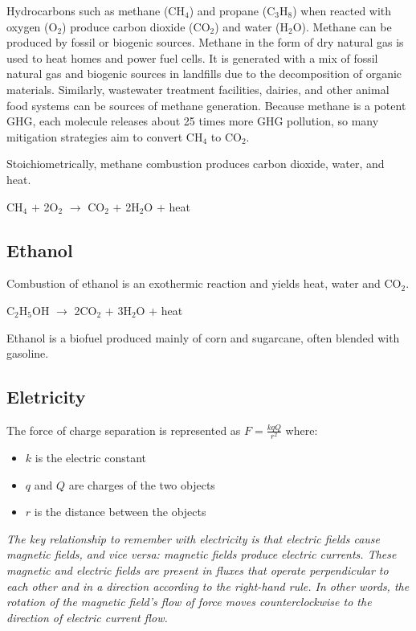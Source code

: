 Hydrocarbons such as methane (CH$_4$) and propane (C$_3$H$_8$) when reacted
with oxygen (O$_2$) produce carbon dioxide (CO$_2$) and water (H$_2$O).
Methane can be produced by fossil or biogenic sources. Methane in the form of
dry natural gas is used to heat homes and power fuel cells. It is generated
with a mix of fossil natural gas and biogenic sources in landfills due to the
decomposition of organic materials. Similarly, wastewater treatment facilities,
dairies, and other animal food systems can be sources of methane generation.
Because methane is a potent GHG, each molecule releases about 25 times more
GHG pollution, so many mitigation strategies aim to convert CH$_4$ to CO$_2$.

Stoichiometrically, methane combustion produces carbon dioxide, water, and
heat.

CH$_4$ $+$ 2O$_2$ $\rightarrow$ CO$_2$ $+$ 2H$_2$O + heat

\subsection{Ethanol}

Combustion of ethanol is an exothermic reaction and yields heat, water and
CO$_2$.

C$_2$H$_5$OH $\rightarrow$ 2CO$_2$ $+$ 3H$_2$O $+$ heat

Ethanol is a biofuel produced mainly of corn and sugarcane, often blended with
gasoline.

\subsection{Eletricity}

The force of charge separation is represented as
$F = \frac{kqQ}{r^2}$
where:

\begin{itemize}
	\item $k$ is the electric constant
	\item $q$ and $Q$ are charges of the two objects
	\item $r$ is the distance between the objects
\end{itemize}

\textit{
The key relationship to remember with electricity is that electric fields cause
magnetic fields, and vice versa: magnetic fields produce electric currents.
These magnetic and electric fields are present in fluxes that operate
perpendicular to each other and in a direction according to the right-hand
rule. In other words, the rotation of the magnetic field’s flow of force moves
counterclockwise to the direction of electric current flow.
}

